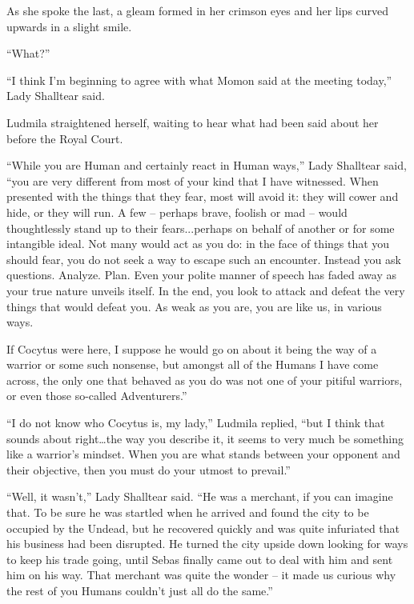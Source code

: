  

As she spoke the last, a gleam formed in her crimson eyes and her lips curved upwards in a slight smile.

 

“What?”

 

“I think I’m beginning to agree with what Momon said at the meeting today,” Lady Shalltear said.

 

Ludmila straightened herself, waiting to hear what had been said about her before the Royal Court.

 

“While you are Human and certainly react in Human ways,” Lady Shalltear said, “you are very different from most of your kind that I have witnessed. When presented with the things that they fear, most will avoid it: they will cower and hide, or they will run. A few – perhaps brave, foolish or mad – would thoughtlessly stand up to their fears...perhaps on behalf of another or for some intangible ideal. Not many would act as you do: in the face of things that you should fear, you do not seek a way to escape such an encounter. Instead you ask questions. Analyze. Plan. Even your polite manner of speech has faded away as your true nature unveils itself. In the end, you look to attack and defeat the very things that would defeat you. As weak as you are, you are like us, in various ways.

 

If Cocytus were here, I suppose he would go on about it being the way of a warrior or some such nonsense, but amongst all of the Humans I have come across, the only one that behaved as you do was not one of your pitiful warriors, or even those so-called Adventurers.”

 

“I do not know who Cocytus is, my lady,” Ludmila replied, “but I think that sounds about right…the way you describe it, it seems to very much be something like a warrior’s mindset. When you are what stands between your opponent and their objective, then you must do your utmost to prevail.”

 

“Well, it wasn’t,” Lady Shalltear said. “He was a merchant, if you can imagine that. To be sure he was startled when he arrived and found the city to be occupied by the Undead, but he recovered quickly and was quite infuriated that his business had been disrupted. He turned the city upside down looking for ways to keep his trade going, until Sebas finally came out to deal with him and sent him on his way. That merchant was quite the wonder – it made us curious why the rest of you Humans couldn’t just all do the same.”

